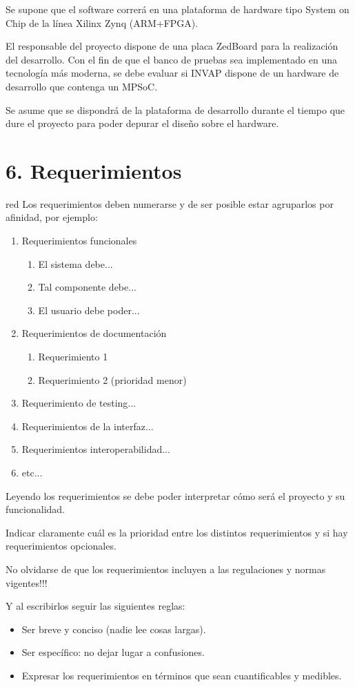 \documentclass[
11pt, %
]{charter}
\begin{document}
Se supone que el software correrá en una plataforma de hardware tipo System on Chip de la línea Xilinx Zynq (ARM+FPGA).

El responsable del proyecto dispone de una placa ZedBoard para la realización del desarrollo. Con el fin de que el banco de pruebas sea implementado en una tecnología más moderna, se debe evaluar si INVAP dispone de un hardware de desarrollo que contenga un MPSoC.

Se asume que se dispondrá de la plataforma de desarrollo durante el tiempo que dure el proyecto para poder depurar el diseño sobre el hardware.

\section{6. Requerimientos}
\label{sec:requerimientos}

\begin{consigna}{red}
Los requerimientos deben numerarse y de ser posible estar agruparlos por afinidad, por ejemplo:

\begin{enumerate}
	\item Requerimientos funcionales
		\begin{enumerate}
			\item El sistema debe...
			\item Tal componente debe...
			\item El usuario debe poder...
		\end{enumerate}
	\item Requerimientos de documentación
		\begin{enumerate}
			\item Requerimiento 1
			\item Requerimiento 2 (prioridad menor)
		\end{enumerate}
	\item Requerimiento de testing...
	\item Requerimientos de la interfaz...
	\item Requerimientos interoperabilidad...
	\item etc...
\end{enumerate}

Leyendo los requerimientos se debe poder interpretar cómo será el proyecto y su funcionalidad.

Indicar claramente cuál es la prioridad entre los distintos requerimientos y si hay requerimientos opcionales. 

No olvidarse de que los requerimientos incluyen a las regulaciones y normas vigentes!!!

Y al escribirlos seguir las siguientes reglas:
\begin{itemize}
	\item Ser breve y conciso (nadie lee cosas largas). 
	\item Ser específico: no dejar lugar a confusiones.
	\item Expresar los requerimientos en términos que sean cuantificables y medibles.
\end{itemize}

\end{consigna}
\end{document}
